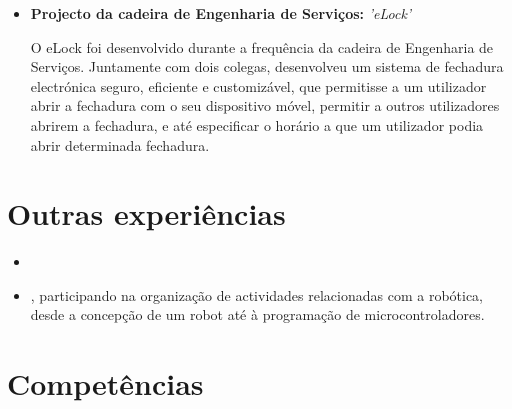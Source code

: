 \documentclass[11pt,a4paper,sans]{moderncv}        %
\begin{document}
\begin{itemize}
\vspace{6pt}

\item{\textbf{Projecto da cadeira de Engenharia de Serviços: }\textit{'eLock'}

\vspace{3pt}

\small{O eLock foi desenvolvido durante a frequência da cadeira de Engenharia de Serviços. Juntamente com dois colegas, desenvolveu um sistema de fechadura electrónica seguro, eficiente e customizável, que permitisse a um utilizador abrir a fechadura com o seu dispositivo móvel, permitir a outros utilizadores abrirem a fechadura, e até especificar o horário a que um utilizador podia abrir determinada fechadura.}}

\end{itemize}

\section{Outras experiências}

\vspace{6pt}

\begin{itemize}
\item{}

\vspace{6pt}

\item{, participando na organização de actividades relacionadas com a robótica, desde a concepção de um robot até à programação de microcontroladores.}
\end{itemize}

\section{Competências}

\vspace{6pt}
\end{document}
